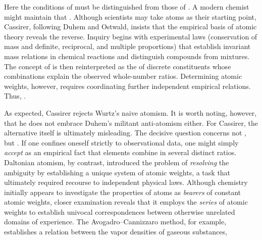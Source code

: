 \documentclass[submitted,12pt]{article}
\renewcommand{\SF}[2]{\citep[#1/#2]{Cassirer1910}}
\renewcommand{\me}{\footnote{Emphasis mine}}
\begin{document}
Here the conditions of  must be distinguished from those of  \SF{279}{210}. A modern chemist might maintain that  \SF{275}{207}. Although scientists may take atoms as their starting point, Cassirer, following Duhem and Ostwald, insists that the empirical basis of atomic theory reveals the reverse. Inquiry begins with experimental laws (conservation of mass and definite, reciprocal, and multiple proportions) that establish invariant mass relations in chemical reactions and distinguish compounds from mixtures. The concept of  is then reinterpreted as the  of discrete constituents whose combinations explain the observed whole-number ratios. Determining atomic weights, however, requires coordinating further independent empirical relations. Thus,  \SF{276}{208}.


As expected, Cassirer rejects Wurtz's naive atomism. It is worth noting, however, that he does not embrace Duhem's militant anti-atomism either. For Cassirer, the alternative itself is ultimately misleading. The decisive question concerns not , but  \SF{276--77}{208\me}. If one confines oneself strictly to observational data, one might simply \emph{accept} as an empirical fact that elements combine in several distinct ratios. Daltonian atomism, by contrast, introduced the problem of \emph{resolving} the ambiguity by establishing a unique system of atomic weights, a task that ultimately required recourse to independent physical laws. Although chemistry initially appears to investigate the properties of atoms as \emph{bearers} of constant atomic weights, closer examination reveals that it employs the \emph{series} of atomic weights to establish univocal correspondences between otherwise unrelated domains of experience. The Avogadro--Cannizzaro method, for example, establishes a relation between the vapor densities of gaseous substances,
\end{document}
